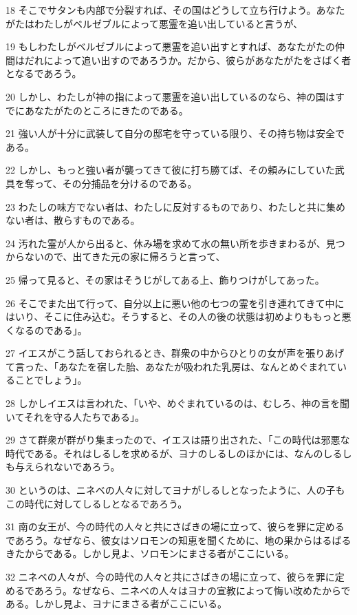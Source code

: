\par 18 そこでサタンも内部で分裂すれば、その国はどうして立ち行けよう。あなたがたはわたしがベルゼブルによって悪霊を追い出していると言うが、
\par 19 もしわたしがベルゼブルによって悪霊を追い出すとすれば、あなたがたの仲間はだれによって追い出すのであろうか。だから、彼らがあなたがたをさばく者となるであろう。
\par 20 しかし、わたしが神の指によって悪霊を追い出しているのなら、神の国はすでにあなたがたのところにきたのである。
\par 21 強い人が十分に武装して自分の邸宅を守っている限り、その持ち物は安全である。
\par 22 しかし、もっと強い者が襲ってきて彼に打ち勝てば、その頼みにしていた武具を奪って、その分捕品を分けるのである。
\par 23 わたしの味方でない者は、わたしに反対するものであり、わたしと共に集めない者は、散らすものである。
\par 24 汚れた霊が人から出ると、休み場を求めて水の無い所を歩きまわるが、見つからないので、出てきた元の家に帰ろうと言って、
\par 25 帰って見ると、その家はそうじがしてある上、飾りつけがしてあった。
\par 26 そこでまた出て行って、自分以上に悪い他の七つの霊を引き連れてきて中にはいり、そこに住み込む。そうすると、その人の後の状態は初めよりももっと悪くなるのである」。
\par 27 イエスがこう話しておられるとき、群衆の中からひとりの女が声を張りあげて言った、「あなたを宿した胎、あなたが吸われた乳房は、なんとめぐまれていることでしょう」。
\par 28 しかしイエスは言われた、「いや、めぐまれているのは、むしろ、神の言を聞いてそれを守る人たちである」。
\par 29 さて群衆が群がり集まったので、イエスは語り出された、「この時代は邪悪な時代である。それはしるしを求めるが、ヨナのしるしのほかには、なんのしるしも与えられないであろう。
\par 30 というのは、ニネベの人々に対してヨナがしるしとなったように、人の子もこの時代に対してしるしとなるであろう。
\par 31 南の女王が、今の時代の人々と共にさばきの場に立って、彼らを罪に定めるであろう。なぜなら、彼女はソロモンの知恵を聞くために、地の果からはるばるきたからである。しかし見よ、ソロモンにまさる者がここにいる。
\par 32 ニネベの人々が、今の時代の人々と共にさばきの場に立って、彼らを罪に定めるであろう。なぜなら、ニネベの人々はヨナの宣教によって悔い改めたからである。しかし見よ、ヨナにまさる者がここにいる。
